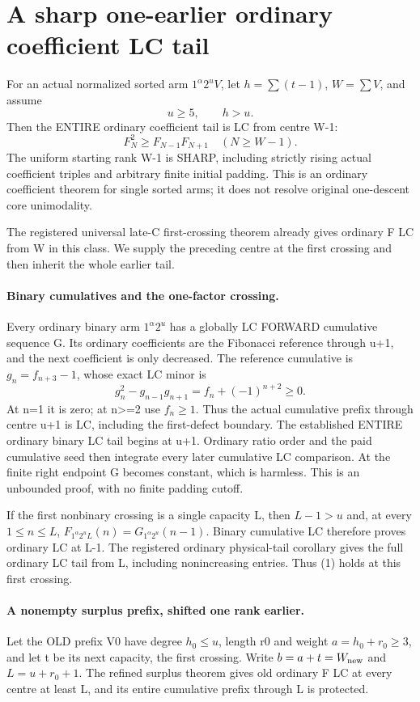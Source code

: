 \section{A sharp one-earlier ordinary coefficient LC tail}
For an actual normalized sorted arm $1^\alpha2^uV$, let
$h=\sum(t-1)$, $W=\sum V$, and assume
\[
                              u\ge5,\qquad h>u .
\]
Then the ENTIRE ordinary coefficient tail is LC from centre W-1:
\[
                         F_N^2\ge F_{N-1}F_{N+1}
                                      \quad(N\ge W-1).     \tag{1}
\]
The uniform starting rank W-1 is SHARP, including strictly rising
actual coefficient triples and arbitrary finite initial padding.
This is an ordinary coefficient theorem for single sorted arms;
it does not resolve original one-descent core unimodality.

The registered universal late-C first-crossing theorem already gives
ordinary F LC from W in this class. We supply the preceding centre
at the first crossing and then inherit the whole earlier tail.

\paragraph{Binary cumulatives and the one-factor crossing.}
Every ordinary binary arm $1^\alpha2^u$ has a globally LC FORWARD
cumulative sequence G. Its ordinary coefficients are the Fibonacci
reference through u+1, and the next coefficient is only decreased.
The reference cumulative is $g_n=f_{n+3}-1$, whose exact LC minor is
\[
                         g_n^2-g_{n-1}g_{n+1}
                              =f_n+(-1)^{n+2}\ge0.
\]
At n=1 it is zero; at n>=2 use $f_n\ge1$.
Thus the actual cumulative prefix through centre u+1 is LC, including
the first-defect boundary. The established ENTIRE ordinary binary
LC tail begins at u+1. Ordinary ratio order and the paid cumulative
seed then integrate every later cumulative LC comparison.
At the finite right endpoint G becomes constant, which is harmless.
This is an unbounded proof, with no finite padding cutoff.

If the first nonbinary crossing is a single capacity L, then
$L-1>u$ and, at every $1\le n\le L$,
$F_{1^\alpha2^uL}(n)=G_{1^\alpha2^u}(n-1)$.
Binary cumulative LC therefore proves ordinary LC at L-1.
The registered ordinary physical-tail corollary gives the full ordinary
LC tail from L, including nonincreasing entries. Thus (1) holds at this first crossing.

\paragraph{A nonempty surplus prefix, shifted one rank earlier.}
Let the OLD prefix V0 have degree $h_0\le u$, length r0 and weight
$a=h_0+r_0\ge3$, and let t be its next capacity, the first crossing.
Write $b=a+t=W_{\rm new}$ and $L=u+r_0+1$.
The refined surplus theorem gives old ordinary F LC at every centre
at least L, and its entire cumulative prefix through L is protected.

